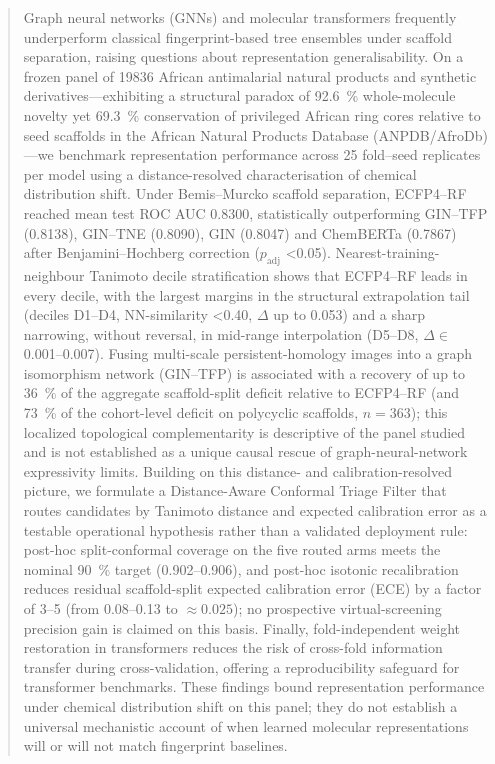 \documentclass[11pt,a4paper]{article}
\begin{document}
\begin{abstract}
Graph neural networks (GNNs) and molecular transformers frequently underperform classical fingerprint-based tree ensembles under scaffold separation, raising questions about representation generalisability. On a frozen panel of \num{19836} African antimalarial natural products and synthetic derivatives---exhibiting a structural paradox of \qty{92.6}{\percent} whole-molecule novelty yet \qty{69.3}{\percent} conservation of privileged African ring cores relative to seed scaffolds in the African Natural Products Database (ANPDB/AfroDb)---we benchmark representation performance across \num{25} fold--seed replicates per model using a distance-resolved characterisation of chemical distribution shift. Under Bemis--Murcko scaffold separation, ECFP4--RF reached mean test ROC AUC \num{0.8300}, statistically outperforming GIN--TFP (\num{0.8138}), GIN--TNE (\num{0.8090}), GIN (\num{0.8047}) and ChemBERTa (\num{0.7867}) after Benjamini--Hochberg correction ($p_{\text{adj}}$ \num{<0.05}). Nearest-training-neighbour Tanimoto decile stratification shows that ECFP4--RF leads in every decile, with the largest margins in the structural extrapolation tail (deciles D1--D4, NN-similarity \num{<0.40}, $\Delta$ up to \num{0.053}) and a sharp narrowing, without reversal, in mid-range interpolation (D5--D8, $\Delta \in$ \numrange{0.001}{0.007}). Fusing multi-scale persistent-homology images into a graph isomorphism network (GIN--TFP) is associated with a recovery of up to \qty{36}{\percent} of the aggregate scaffold-split deficit relative to ECFP4--RF (and \qty{73}{\percent} of the cohort-level deficit on polycyclic scaffolds, $n=\num{363}$); this localized topological complementarity is descriptive of the panel studied and is not established as a unique causal rescue of graph-neural-network expressivity limits. Building on this distance- and calibration-resolved picture, we formulate a Distance-Aware Conformal Triage Filter that routes candidates by Tanimoto distance and expected calibration error as a testable operational hypothesis rather than a validated deployment rule: post-hoc split-conformal coverage on the five routed arms meets the nominal \qty{90}{\percent} target (\numrange{0.902}{0.906}), and post-hoc isotonic recalibration reduces residual scaffold-split expected calibration error (ECE) by a factor of \numrange{3}{5} (from \numrange{0.08}{0.13} to $\approx\num{0.025}$); no prospective virtual-screening precision gain is claimed on this basis. Finally, fold-independent weight restoration in transformers reduces the risk of cross-fold information transfer during cross-validation, offering a reproducibility safeguard for transformer benchmarks. These findings bound representation performance under chemical distribution shift on this panel; they do not establish a universal mechanistic account of when learned molecular representations will or will not match fingerprint baselines.
\end{abstract}
\end{document}
